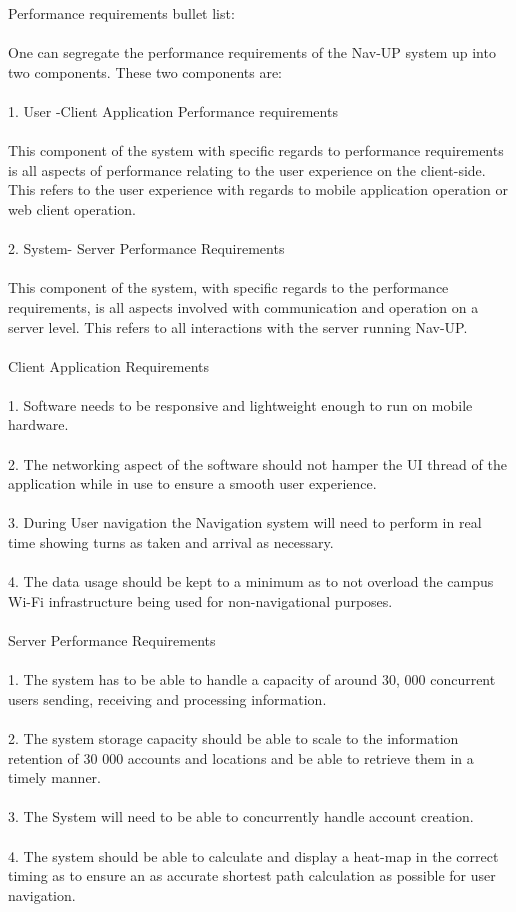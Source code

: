 \documentclass{article}
\begin{document}
	{Performance requirements bullet list:\\\\
One can segregate the performance requirements of the Nav-UP system up into two components. These two components are:\\\\
1. User -Client Application Performance requirements\\\\
This component of the system with specific regards to performance requirements is all aspects of performance relating to the user experience on the client-side. This refers to the user experience with regards to mobile application operation or web client operation.\\\\
2. System- Server Performance Requirements\\\\
This component of the system, with specific regards to the performance requirements, is all aspects involved with communication and operation on a server level. This refers to all interactions with the server running Nav-UP.\\\\
Client Application Requirements\\\\
1.	Software needs to be responsive and lightweight enough to run on mobile hardware.\\\\
2.	The networking aspect of the software should not hamper the UI thread of the application while in use to ensure a smooth user experience.\\\\
3.	During User navigation the Navigation system will need to perform in real time showing turns as taken and arrival as necessary.\\\\
4.	The data usage should be kept to a minimum as to not overload the campus Wi-Fi infrastructure being used for non-navigational purposes.\\\\
Server Performance Requirements\\\\
1.	The system has to be able to handle a capacity of around 30, 000 concurrent users sending, receiving and processing information.\\\\
2.	The system storage capacity should be able to scale to the information retention of 30 000 accounts and locations and be able to retrieve them in a timely manner.\\\\
3.	The System will need to be able to concurrently handle account creation.\\\\
4.	The system should be able to calculate and display a heat-map in the correct timing as to ensure an as accurate shortest path calculation as possible for user navigation.\\\\

	}
\end{document}
